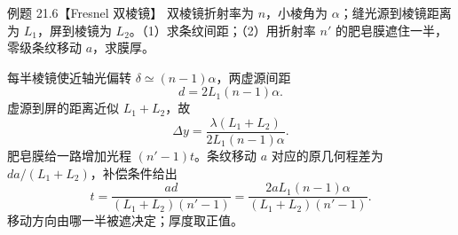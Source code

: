 \BiprismDiagram

\begin{origexamplebox}{例题 21.6【Fresnel 双棱镜】}
双棱镜折射率为 $n$，小棱角为 $\alpha$；缝光源到棱镜距离为 $L_1$，屏到棱镜为 $L_2$。（1）求条纹间距；（2）用折射率 $n'$ 的肥皂膜遮住一半，零级条纹移动 $a$，求膜厚。
\end{origexamplebox}
\begin{xesolution}
每半棱镜使近轴光偏转 $\delta\simeq(n-1)\alpha$，两虚源间距
\[
 d=2L_1(n-1)\alpha.
\]
虚源到屏的距离近似 $L_1+L_2$，故
\[
 \boxed{\Delta y=\frac{\lambda(L_1+L_2)}{2L_1(n-1)\alpha}}.
\]
肥皂膜给一路增加光程 $(n'-1)t$。条纹移动 $a$ 对应的原几何程差为 $da/(L_1+L_2)$，补偿条件给出
\[
 \boxed{t=\frac{ad}{(L_1+L_2)(n'-1)}
 =\frac{2aL_1(n-1)\alpha}{(L_1+L_2)(n'-1)}}.
\]
移动方向由哪一半被遮决定；厚度取正值。
\end{xesolution}

\DoubleMirrorDiagram

